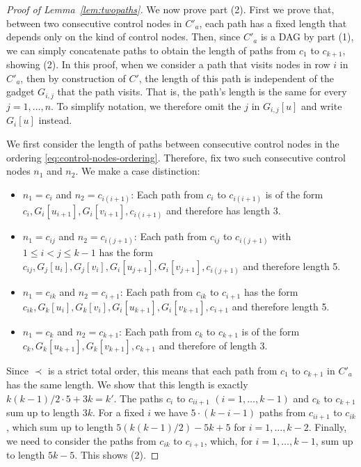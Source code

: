 \documentclass[a4paper,english]{lipics-v2016}
\theoremstyle{plain}
\begin{document}
\begin{proof}[Proof of Lemma~\ref{lem:twopaths}]
    
                  
        
                                

  We now prove part (2). 
                First we prove that, between two consecutive control nodes in
  $C'_a$, each path has a fixed length that depends only on the kind
  of control nodes.  Then, since $C'_a$ is a DAG by part (1), we can
  simply concatenate paths to obtain the length of paths from $c_1$ to
  $c_{k+1}$, showing (2). In this proof, when we consider a path that visits nodes in
  row $i$ in $C'_a$, then by construction of $C'$, the length of this
  path is independent of the gadget $G_{i,j}$ that the path
  visits. That is, the path's length is the same for every $j =
  1,\ldots,n$. To simplify notation, we therefore omit the $j$ in
  $G_{i,j}[u]$ and write $G_{i}[u]$ instead.
  
  We first consider the length of paths between consecutive control
  nodes in the ordering \eqref{eq:control-nodes-ordering}. Therefore,
  fix two such consecutive control nodes $n_1$ and $n_2$. We make a
  case distinction:
  \begin{itemize}
  \item $n_1 = c_i$ and $n_2 = c_{i(i+1)}$: Each path from $c_i$ to
    $c_{i(i+1)}$ is of the form $c_{i},G_{i}[u_{i+1}], \allowbreak
    G_{i}[v_{i+1}], \allowbreak c_{i (i+1)}$ and therefore has length 3.
  \item $n_1 = c_{ij}$ and $n_2 = c_{i(j+1)}$: Each path from $c_{ij}$
    to $c_{i(j+1)}$ with $1 \leq i < j \leq k-1$ has the form
    $c_{ij}, \allowbreak G_{j}[u_{i}], G_{j}[v_{i}], G_{i}[u_{j+1}],
    \allowbreak G_{i}[v_{j+1}], \allowbreak c_{i(j+1)}$ and therefore 
    length 5.
  \item $n_1 = c_{ik}$ and $n_2 = c_{i+1}$: Each path from $c_{ik}$ to
    $c_{i+1}$ has the form $c_{ik}, G_{k}[u_{i}], G_{k}[v_{i}], \allowbreak
    G_{i}[u_{k+1}], \allowbreak G_{i}[v_{k+1}], c_{i+1}$ and therefore
    length 5.
  \item $n_1 = c_{k}$ and $n_2 = c_{k+1}$: Each path
  from $c_{k}$ to $c_{k+1}$ is of the form $c_{k}, G_{k}[u_{k+1}],
  G_{k}[v_{k+1}],\allowbreak c_{k+1}$ and therefore of length 3.
  \end{itemize}

  Since $\prec$ is a strict total order, this means that each path
  from $c_1$ to $c_{k+1}$ in $C'_a$ has the same length.
   We show that this length is
  exactly $k(k-1)/2\cdot 5+3k = k'$. The paths $c_i$ to $c_{ii+1}$ $(i
  = 1, \ldots, k-1)$ and $c_k$ to $c_{k+1}$ sum up to length $3k$. For a
  fixed $i$ we have $5\cdot(k-i-1)$ paths from $c_{ii+1}$ to $c_{ik}$,
  which sum up to length $5(k(k-1)/2)-5k+5$ for $i=1,\ldots, k-2$.
  Finally, we need to consider the paths from $c_{ik}$ to $c_{i+1}$,
  which, for $i=1,\ldots, k-1$, sum up to length $5k-5$.  This shows
  (2).


\end{proof}
\end{document}

